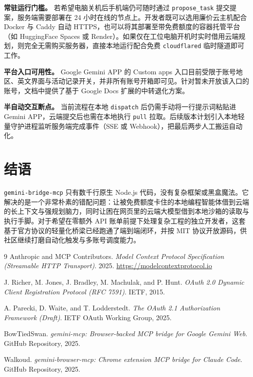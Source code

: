 \documentclass[10pt,a4paper,twocolumn]{article}
\begin{document}
\textbf{常驻运行门槛。} 若希望电脑关机后手机端仍可随时通过 \texttt{propose\_task} 提交提案，服务端需要部署在 24 小时在线的节点上。开发者既可以选用廉价云主机配合 Docker 与 Caddy 自动 HTTPS，也可以将其部署至带免费额度的容器托管平台（如 HuggingFace Spaces 或 Render）。如果仅在工位电脑开机时实时借用云端规划，则完全无需购买服务器，直接本地运行配合免费 \texttt{cloudflared} 临时隧道即可工作。

\textbf{平台入口可用性。} Google Gemini APP 的 Custom apps 入口目前受限于账号地区、英文界面与活动记录开关，并非所有账号开箱即可见。针对暂未开放该入口的账号，文档中提供了基于 Google Docs 扩展的中转退化方案。

\textbf{半自动交互断点。} 当前流程在本地 \texttt{dispatch} 后仍需手动将一行提示词粘贴进 Gemini APP，云端提交后也需在本地执行 \texttt{pull} 拉取。后续版本计划引入本地轻量守护进程监听服务端完成事件（SSE 或 Webhook），把最后两步人工搬运自动化。

\section{结语}

\texttt{gemini-bridge-mcp} 只有数千行原生 Node.js 代码，没有复杂框架或黑盒魔法。它解决的是一个非常朴素的错配问题：让被免费额度卡住的本地编程智能体借到云端的长上下文与强规划脑力，同时让困在网页里的云端大模型借到本地沙箱的读取与执行手脚。对于希望在零额外 API 账单前提下处理复杂工程的独立开发者，这套基于官方协议的轻量化桥梁已经跑通了端到端闭环，并按 MIT 协议开放源码，供社区继续打磨自动化触发与多账号调度能力。

\begin{thebibliography}{9}
\scriptsize
{}
Anthropic and MCP Contributors. \emph{Model Context Protocol Specification (Streamable HTTP Transport)}. 2025. \url{https://modelcontextprotocol.io}

J. Richer, M. Jones, J. Bradley, M. Machulak, and P. Hunt. \emph{OAuth 2.0 Dynamic Client Registration Protocol (RFC 7591)}. IETF, 2015.

A. Parecki, D. Waite, and T. Lodderstedt. \emph{The OAuth 2.1 Authorization Framework (Draft)}. IETF OAuth Working Group, 2025.

BowTiedSwan. \emph{gemini-mcp: Browser-backed MCP bridge for Google Gemini Web}. GitHub Repository, 2025.

Walkoud. \emph{gemini-browser-mcp: Chrome extension MCP bridge for Claude Code}. GitHub Repository, 2025.
\end{thebibliography}
\end{document}

